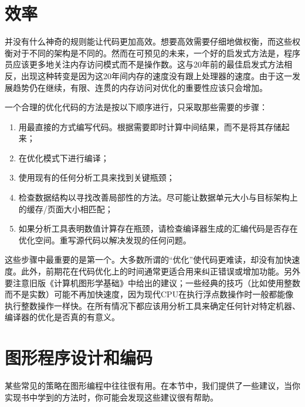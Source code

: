 \documentclass[lang=cn,12pt,marginpar=margintrue]{elegantbook}
\begin{document}
\section{效率}

并没有什么神奇的规则能让代码更加高效。想要高效需要仔细地做权衡，而这些权衡对于不同的架构是不同的。然而在可预见的未来，一个好的启发式方法是，程序员应该更多地关注内存访问模式而不是操作数。这与20年前的最佳启发式方法相反，出现这种转变是因为这20年间内存的速度没有跟上处理器的速度。由于这一发展趋势仍在继续，有限、连贯的内存访问对优化的重要性应该只会增加。

一个合理的优化代码的方法是按以下顺序进行，只采取那些需要的步骤：
\begin{enumerate}
  \item 用最直接的方式编写代码。根据需要即时计算中间结果，而不是将其存储起来；
  \item 在优化模式下进行编译；
  \item 使用现有的任何分析工具来找到关键瓶颈；
  \item 检查数据结构以寻找改善局部性的方法。尽可能让数据单元大小与目标架构上的缓存/页面大小相匹配；
  \item 如果分析工具表明数值计算存在瓶颈，请检查编译器生成的汇编代码是否存在优化空间。重写源代码以解决发现的任何问题。
\end{enumerate}
这些步骤中最重要的是第一个。大多数所谓的“优化”使代码更难读，却没有加快速度。此外，前期花在代码优化上的时间通常更适合用来纠正错误或增加功能。另外要注意旧版《计算机图形学基础》中给出的建议；一些经典的技巧（比如使用整数而不是实数）可能不再加快速度，因为现代CPU在执行浮点数操作时一般都能像执行整数操作一样快。在所有情况下都应该用分析工具来确定任何针对特定机器、编译器的优化是否真的有意义。

\section{图形程序设计和编码}

某些常见的策略在图形编程中往往很有用。在本节中，我们提供了一些建议，当你实现书中学到的方法时，你可能会发现这些建议很有帮助。

\end{document}
